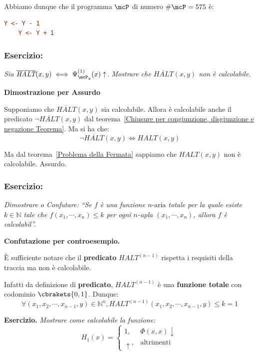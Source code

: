 Abbiamo dunque che il programma \(\mcP\) di numero \#\(\mcP=575\) è:
\begin{lstlisting}[language=ini, label={Codifica 3 es},  caption= Esercizio Codifica Programmi 3]
    Y <- Y - 1
    Y <- Y + 1
\end{lstlisting}

\subsubsection*{Esercizio:} \textit{Sia \(\overline{\textit{HALT}}(x,y) \iff \Psi_{\mcP_y}^{(1)}(x) \uparrow \). Mostrare che \(\overline{\textit{HALT}}(x,y)\) non è calcolabile.}

\textbf{Dimostrazione per Assurdo}

Supponiamo che \(\overline{\textit{HALT}}(x,y)\) sia calcolabile. Allora è calcolabile anche il predicato \(\neg \overline{\textit{HALT}}(x,y)\) dal teorema~\ref{Chiusure per congiunzione, disgiunzione e negazione Teorema}. Ma si ha che:
\begin{equation}
    \neg \overline{\textit{HALT}}(x,y) \iff \textit{HALT}(x,y)
\end{equation}

Ma dal teorema~\ref{Problema della Fermata} sappiamo che \(\textit{HALT}(x,y)\) non è calcolabile. Assurdo.


\subsubsection*{Esercizio:}
\textit{Dimostrare o Confutare: ``Se \(f\) è una funzione \(n\text{-aria}\) totale per la quale esiste \(k\in\mathbb{N}\) tale che \(f(x_1,\cdots,x_n)\leq k\) per ogni \(n\)-upla \((x_1,\cdots,x_n)\), allora \(f\) è calcolabil''.}

\textbf{Confutazione per controesempio.}

È sufficiente notare che il \textbf{predicato} \(\textit{HALT}^{(n-1)}\) rispetta i requisiti della traccia ma non è calcolabile.

Infatti da definizione di \textbf{predicato}, \(\textit{HALT}^{(n-1)}\) è una \textbf{funzione totale} con codominio \(\cbrakets{0,1}\). Dunque:
\begin{equation}
    \forall (x_1,x_2,\cdots, x_{n-1}, y) \in \mathbb{N}^n, \textit{HALT}^{(n-1)}(x_1,x_2,\cdots, x_{n-1}, y)\leq k=1
\end{equation}

\textbf{Esercizio. } \textit{Mostrare come calcolabile la funzione:}
\begin{equation}
    H_1(x) = \begin{cases}
        1, & \Phi(x,x)\downarrow\\
        \uparrow, & \text{altrimenti}
    \end{cases}
\end{equation}

